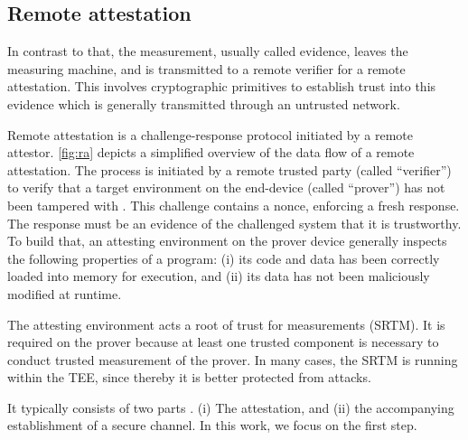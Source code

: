 
\subsection{Remote attestation}




In contrast to that, the measurement, usually called evidence, leaves the measuring machine, and is transmitted to a remote verifier for a remote attestation. This involves cryptographic primitives to establish trust into this evidence which is generally transmitted through an untrusted network.

Remote attestation is a challenge-response protocol initiated by a remote attestor. \autoref{fig:ra} depicts a simplified overview of the data flow of a remote attestation.
The process is initiated by a remote trusted party (called ``verifier'') to verify that a target environment on the end-device (called ``prover'') has not been tampered with \cite{Menetrey2022, Coker2011}. This challenge contains a nonce, enforcing a fresh response.
The response must be an evidence of the challenged system that it is trustworthy. To build that, an attesting environment on the prover device generally inspects the following properties of a program: (i) its code and data has been correctly loaded into memory for execution, and (ii) its data has not been maliciously modified at runtime.

The attesting environment acts a root of trust for measurements (SRTM).
It is required on the prover because at least one trusted component is necessary to conduct trusted measurement of the prover. In many cases, the SRTM is running within the TEE, since thereby it is better protected from attacks.

It typically consists of two parts \cite{McCune2008}. (i) The attestation, and (ii) the accompanying establishment of a secure channel. In this work, we focus on the first step.

